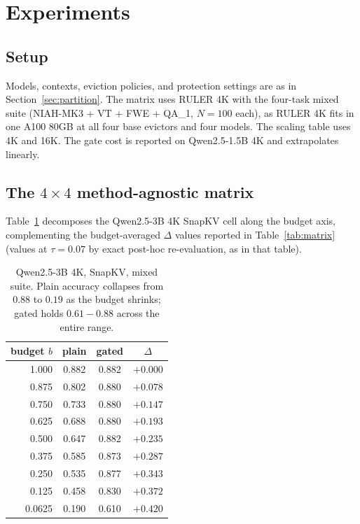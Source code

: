 \documentclass{article} %
\begin{document}
\section{Experiments}
\label{sec:experiments}

\subsection{Setup}

Models, contexts, eviction policies, and protection settings are as in
Section~\ref{sec:partition}. The matrix uses RULER 4K with the four-task
mixed suite (NIAH-MK3 + VT + FWE + QA\_1, $N = 100$ each), as RULER 4K
fits in one A100 80GB at all four base evictors and four models. The
scaling table uses 4K and 16K. The gate cost is reported on Qwen2.5-1.5B
4K and extrapolates linearly.

\subsection{The $4 \times 4$ method-agnostic matrix}

Table~\ref{tab:qwen3b-curve} decomposes the Qwen2.5-3B 4K SnapKV cell
along the budget axis, complementing the
budget-averaged $\Delta$ values reported in Table~\ref{tab:matrix}
(values at $\tau = 0.07$ by exact post-hoc re-evaluation, as in that
table).

\begin{table}[h]
\centering
\caption{Qwen2.5-3B 4K, SnapKV, mixed suite. Plain accuracy collapses
from $0.88$ to $0.19$ as the budget shrinks; gated holds $0.61-0.88$
across the entire range.}
\label{tab:qwen3b-curve}
\begin{tabular}{rccc}
\toprule
budget $b$ & plain & gated & $\Delta$ \\
\midrule
1.000  & 0.882 & 0.882 & $+0.000$ \\
0.875  & 0.802 & 0.880 & $+0.078$ \\
0.750  & 0.733 & 0.880 & $+0.147$ \\
0.625  & 0.688 & 0.880 & $+0.193$ \\
0.500  & 0.647 & 0.882 & $+0.235$ \\
0.375  & 0.585 & 0.873 & $+0.287$ \\
0.250  & 0.535 & 0.877 & $+0.343$ \\
0.125  & 0.458 & 0.830 & $+0.372$ \\
0.0625 & 0.190 & 0.610 & $+0.420$ \\
\bottomrule
\end{tabular}
\end{table}
\end{document}
